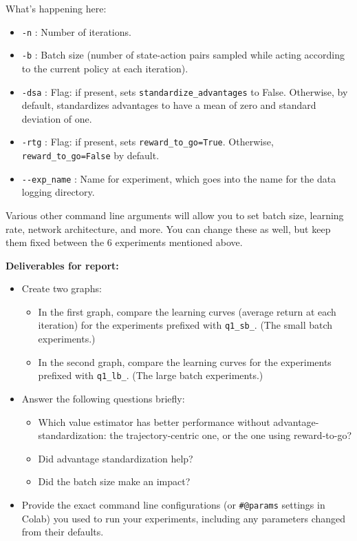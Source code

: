 \documentclass{article}
\begin{document}
What's happening here:
\begin{itemize}
\item \verb|-n| : Number of iterations.
\item \verb|-b| : Batch size (number of state-action pairs sampled while acting according to the current policy at each iteration).
\item \verb|-dsa| : Flag: if present, sets \verb|standardize_advantages| to False. Otherwise, by default, standardizes advantages to have a mean of zero and standard deviation of one.
\item \verb|-rtg| : Flag: if present, sets \verb|reward_to_go=True|. Otherwise, \verb|reward_to_go=False| by default. 
\item \verb|--exp_name| : Name for experiment, which goes into the name for the data logging directory.
\end{itemize}

Various other command line arguments will allow you to set batch size, learning rate, network architecture, and more. You can change these as well, but keep them fixed between the 6 experiments mentioned above.

\vspace{0.1in}
\textbf{Deliverables for report:}

\begin{itemize}
\item Create two graphs:
\begin{itemize}
\item In the first graph, compare the learning curves (average return at each iteration) for the experiments prefixed with \verb|q1_sb_|. (The small batch experiments.)
\item In the second graph, compare the learning curves for the experiments prefixed with \verb|q1_lb_|. (The large batch experiments.)
\end{itemize}
\item Answer the following questions briefly: 
\begin{itemize}
\item Which value estimator has better performance without advantage-standardization: the trajectory-centric one, or the one using reward-to-go?
\item Did advantage standardization help?
\item Did the batch size make an impact?
\end{itemize}
\item Provide the exact command line configurations (or \texttt{\#@params} settings in Colab) you used to run your experiments, including any parameters changed from their defaults.
\end{itemize}
\end{document}
